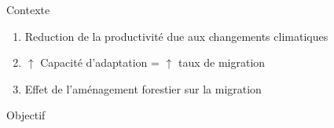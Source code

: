 \documentclass[11pt, compress, aspectratio=1610]{beamer}
\providecommand{\tightlist}{%
  \setlength{\itemsep}{0pt}\setlength{\parskip}{0pt}}
\begin{document}
\begin{frame}{Contexte}

\begin{enumerate}
\def\labelenumi{\arabic{enumi}.}
\tightlist
\item
  Reduction de la productivité due aux changements climatiques
\item
  \(\uparrow\) Capacité d'adaptation = \(\uparrow\) taux de migration
\item
  Effet de l'aménagement forestier sur la migration
\end{enumerate}

\end{frame}

\begin{frame}{Objectif}

\begin{center}
\end{center}
\end{frame}
\end{document}
